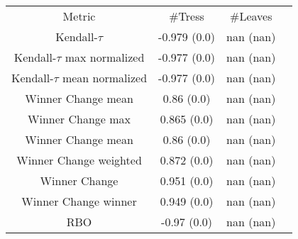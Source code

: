\begin{tabular}{c|c|c|c} 
Metric & #Tress & #Leaves \\ 
Kendall-$\tau$ & -0.979 (0.0) & nan (nan)   \\ 
Kendall-$\tau$ max normalized & -0.977 (0.0) & nan (nan)   \\ 
Kendall-$\tau$ mean normalized & -0.977 (0.0) & nan (nan)   \\ 
Winner Change mean& 0.86 (0.0) & nan (nan)   \\ 
Winner Change max & 0.865 (0.0) & nan (nan)   \\ 
Winner Change mean & 0.86 (0.0) & nan (nan)   \\ 
Winner Change weighted & 0.872 (0.0) & nan (nan)   \\ 
Winner Change & 0.951 (0.0) & nan (nan)   \\ 
Winner Change winner & 0.949 (0.0) & nan (nan)   \\ 
RBO & -0.97 (0.0) & nan (nan)   \\ 
\end{tabular}